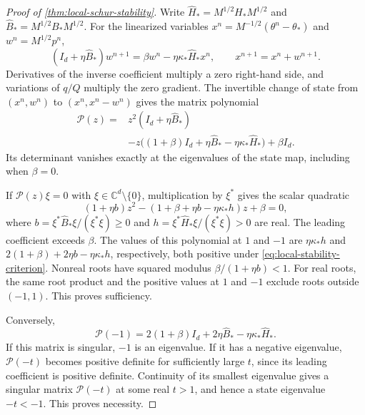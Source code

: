 \begin{proof}[Proof of \cref{thm:local-schur-stability}]
Write \(\widehat H_*=M^{1/2}H_*M^{1/2}\) and
\(\widehat B_*=M^{1/2}B_*M^{1/2}\). For the linearized variables
\(x^n=M^{-1/2}(\theta^n-\theta_*)\) and \(w^n=M^{1/2}p^n\),
\begin{equation}
  (I_d+\eta\widehat B_*)w^{n+1}
  =\beta w^n-\eta\kappa_*\widehat H_*x^n,
  \qquad x^{n+1}=x^n+w^{n+1}.
  \label{eq:linearized-momentum-map}
\end{equation}
Derivatives of the inverse coefficient multiply a zero right-hand side,
and variations of \(q/Q\) multiply the zero gradient. The invertible change
of state from \((x^n,w^n)\) to \((x^n,x^n-w^n)\) gives the matrix polynomial
\begin{equation}
\begin{aligned}
  \mathcal P(z)
  ={}&z^2(I_d+\eta\widehat B_*)\\
  &-z\bigl((1+\beta)I_d+\eta\widehat B_*
                     -\eta\kappa_*\widehat H_*\bigr)+\beta I_d.
\end{aligned}
\label{eq:local-characteristic-polynomial}
\end{equation}
Its determinant vanishes exactly at the eigenvalues of the state map,
including when \(\beta=0\).

If \(\mathcal P(z)\xi=0\) with \(\xi\in\mathbb C^d\setminus\{0\}\),
multiplication by \(\xi^*\) gives the scalar quadratic
\begin{equation}
  (1+\eta b)z^2
  -(1+\beta+\eta b-\eta\kappa_*h)z+\beta=0,
  \label{eq:local-rayleigh-polynomial}
\end{equation}
where \(b=\xi^*\widehat B_*\xi/(\xi^*\xi)\geq0\) and
\(h=\xi^*\widehat H_*\xi/(\xi^*\xi)>0\) are real. The leading
coefficient exceeds \(\beta\). The values of this polynomial at \(1\) and
\(-1\) are \(\eta\kappa_*h\) and
\(2(1+\beta)+2\eta b-\eta\kappa_*h\), respectively, both positive under
\cref{eq:local-stability-criterion}. Nonreal roots have squared modulus
\(\beta/(1+\eta b)<1\). For real roots, the same root product and the
positive values at \(1\) and \(-1\) exclude roots outside \((-1,1)\).
This proves sufficiency.

Conversely,
\[
  \mathcal P(-1)=2(1+\beta)I_d+2\eta\widehat B_*
                                 -\eta\kappa_*\widehat H_*.
\]
If this matrix is singular, \(-1\) is an eigenvalue. If it has a negative
eigenvalue, \(\mathcal P(-t)\) becomes positive definite for sufficiently
large \(t\), since its leading coefficient is positive definite.
Continuity of its smallest eigenvalue gives a singular matrix
\(\mathcal P(-t)\) at some real \(t>1\), and hence a state eigenvalue \(-t<-1\).
This proves necessity.
\end{proof}

